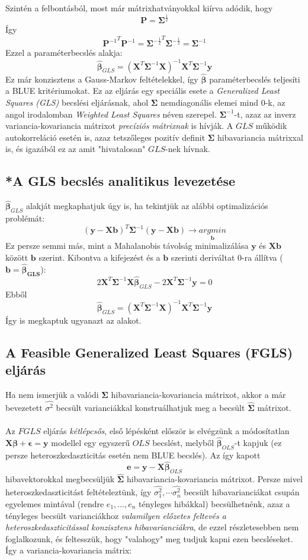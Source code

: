 \documentclass[14p]{report}
\def\pmb{\boldsymbol}
\def\ebeta{\hat{\pmb{\beta}}}
\def\e{\epsilon}
\begin{document}
	Szintén a felbontásból, most már mátrixhatványokkal kiírva adódik, hogy
	\[
		\pmb{P} = \pmb{\Sigma}^{\frac{1}{2}}
	\]
	Így
	\[
		{\pmb{P}^{-1}}^T\pmb{P}^{-1} = {\pmb{\Sigma}^{-\frac{1}{2}}}^T\pmb{\Sigma}^{-\frac{1}{2}} = \pmb{\Sigma}^{-1}
	\]
	Ezzel a paraméterbecslés alakja:
	\[
		\ebeta_{GLS} = (\pmb{X}^T\pmb{\Sigma}^{-1}\pmb{X})^{-1}\pmb{X}^T\pmb{\Sigma}^{-1}\pmb{y}
	\]
	Ez már konzisztens a Gauss-Markov feltételekkel, így $\ebeta$ paraméterbecslés teljesíti a BLUE kritériumokat. Ez az eljárás egy speciális esete a \emph{Generalized Least Squares (GLS)} becslési eljárásnak, ahol $\pmb{\Sigma}$ nemdiagonális elemei mind $0$-k, az angol irodalomban \emph{Weighted Least Squares} néven szerepel. $\pmb{\Sigma}^{-1}$-t, azaz az inverz variancia-kovariancia mátrixot \emph{precíziós mátrixnak} is hívják. A $GLS$ működik autokorreláció esetén is, azaz tetszőleges pozitív definit $\pmb{\Sigma}$ hibavariancia mátrixxal is, és igazából ez az amit "hivatalosan" $GLS$-nek hívnak.
	
	\subsection{*A GLS becslés analitikus levezetése}
	$\ebeta_{GLS}$ alakját megkaphatjuk úgy is, ha tekintjük az alábbi optimalizációs problémát:
	\[
		(\pmb{y} - \pmb{X}\pmb{b})^T\pmb{\Sigma}^{-1}(\pmb{y} - \pmb{X}\pmb{b}) \rightarrow \underset{\pmb{b}}{argmin}
	\]
	Ez persze semmi más, mint a Mahalanobis távolság minimalizálása $\pmb{y}$ és $\pmb{X}\pmb{b}$ között $\pmb{b}$ szerint. Kibontva a kifejezést és a $\pmb{b}$ szerinti deriváltat $0$-ra állítva ($\pmb{b} = \pmb{\ebeta_{GLS}}$):
	\[
		2\pmb{X}^T\pmb{\Sigma}^{-1}\pmb{X}\ebeta_{GLS} - 2\pmb{X}^T\pmb{\Sigma}^{-1}\pmb{y} = 0
	\]
	Ebből
	\[
		\ebeta_{GLS} = (\pmb{X}^T\pmb{\Sigma}^{-1}\pmb{X})^{-1}\pmb{X}^T\pmb{\Sigma}^{-1}\pmb{y}
	\]
	Így is megkaptuk ugyanazt az alakot.
	\subsection{A Feasible Generalized Least Squares (FGLS) eljárás}
	Ha nem ismerjük a valódi $\pmb{\Sigma}$ hibavariancia-kovariancia mátrixot, akkor a már bevezetett $\widehat{\sigma^2}$ becsült varianciákkal konstruálhatjuk meg a becsült $\widehat{\pmb{\Sigma}}$ mátrixot.
	\\
	\\
	Az $FGLS$ eljárás \emph{kétlépcsős}, első lépésként először is elvégzünk a módosítatlan $\pmb{X}\pmb{\beta} + \pmb{\e} = \pmb{y}$ modellel egy egyszerű $OLS$ becslést, melyből $\ebeta_{OLS}$-t kapjuk (ez persze heteroszkedaszticitás esetén nem BLUE becslés). Az így kapott
	\[
		\pmb{e} = \pmb{y} - \pmb{X}\ebeta_{OLS}
	\]
	hibavektorokkal megbecsüljük $\widehat{\pmb{\Sigma}}$ hibavariancia-kovariancia mátrixot. Persze mivel heteroszkedaszticitást feltételeztünk, így $\widehat{\sigma_1^2}, \dotsm \widehat{\sigma_n^2}$ becsült hibavarianciákat csupán egyelemes mintával (rendre $e_1, \dots, e_n$ tényleges hibákkal) becsülhetnénk, azaz a tényleges becsült varianciákhoz \emph{valamilyen előzetes feltevés a heteroszkedaszticitással konzisztens hibavarianciákra}, de ezzel részletesebben nem foglalkozunk, és feltesszük, hogy "valahogy" meg tudjuk kapni ezen becsléseket. Így a variancia-kovariancia mátrix:  
\end{document}

